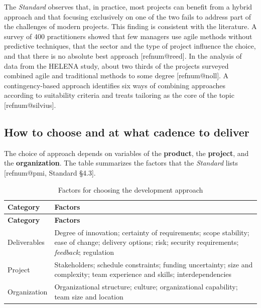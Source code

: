 \documentclass[11pt,a4paper]{article}
\makeatletter
\newcommand{\refnum}[1]{\csname refnum@#1\endcsname}
\newcommand{\cit}[1]{[\refnum{#1}]}
\newcommand{\SingleSpacing}{}
\newcommand{\fontetab}[1]{\par\vspace{3pt}{\small\noindent Source: #1\par}}
\makeatother
\begin{document}
The \textit{Standard} observes that, in practice, most projects can benefit from a hybrid approach and that focusing exclusively on one of the two fails to address part of the challenges of modern projects. This finding is consistent with the literature. A survey of 400 practitioners showed that few managers use agile methods without predictive techniques, that the sector and the type of project influence the choice, and that there is no absolute best approach [\refnum{reed}]. In the analysis of data from the HELENA study, about two thirds of the projects surveyed combined agile and traditional methods to some degree [\refnum{noll}]. A contingency-based approach identifies six ways of combining approaches according to suitability criteria and treats tailoring as the core of the topic [\refnum{silvius}].
\subsection{How to choose and at what cadence to deliver}

The choice of approach depends on variables of the \textbf{product}, the \textbf{project}, and the \textbf{organization}. The table summarizes the factors that the \textit{Standard} lists [\refnum{pmi}, Standard §4.3].

\begingroup\SingleSpacing\small
\begin{longtable}{@{}>{\raggedright\arraybackslash}p{}>{\raggedright\arraybackslash}p{}@{}}
\caption{Factors for choosing the development approach}\label{tab:t5}\\
\toprule
\textbf{Category} & \textbf{Factors}\\
\midrule
\endfirsthead
\toprule
\textbf{Category} & \textbf{Factors}\\
\midrule
\endhead
\bottomrule
\endfoot
\bottomrule
\endlastfoot
Deliverables & Degree of innovation; certainty of requirements; scope stability; ease of change; delivery options; risk; security requirements; \textit{feedback}; regulation\\[3pt]
Project & Stakeholders; schedule constraints; funding uncertainty; size and complexity; team experience and skills; interdependencies\\[3pt]
Organization & Organizational structure; culture; organizational capability; team size and location\\[3pt]
\end{longtable}
\endgroup
\fontetab{Prepared by the authors (2026), based on \cit{pmi}.}
\end{document}
